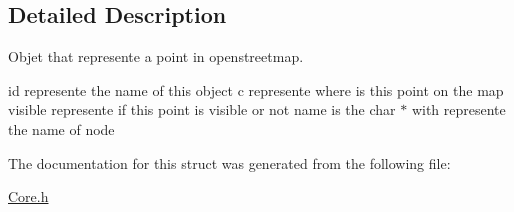 \subsection{Detailed Description}
Objet that represente a point in openstreetmap. 

id represente the name of this object c represente where is this point on the map visible represente if this point is visible or not name is the char $\ast$ with represente the name of node 

The documentation for this struct was generated from the following file\-:\begin{DoxyCompactItemize}
\item 
\hyperlink{Core_8h}{Core.\-h}\end{DoxyCompactItemize}
